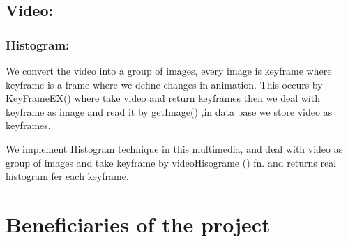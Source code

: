 \vskip 0.3in
\subsection{Video: }
\subsubsection{Histogram:}
We convert the video into a group of images, every image is keyframe where keyframe is a frame where we define
 changes in animation. \linebreak This occurs by KeyFrameEX() where take video and return keyframes then we deal with 
 keyframe as image and read it by getImage() ,in data base we store video as keyframes. 

\vskip 0.2in
We implement Histogram technique in this multimedia, and deal with video as group of images and take keyframe by 
videoHisograme () fn. and returns real histogram fer each keyframe.




\section{Beneficiaries of the project}





